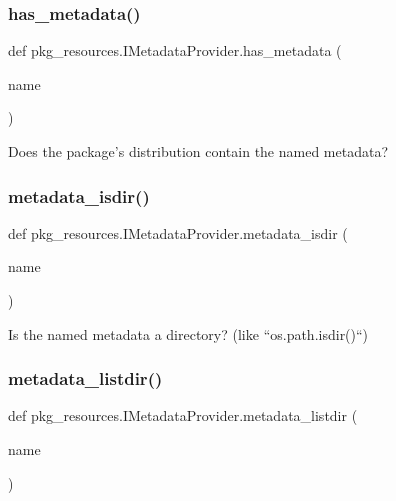 \subsubsection{\texorpdfstring{has\+\_\+metadata()}{has\_metadata()}}
{\footnotesize\ttfamily def pkg\+\_\+resources.\+I\+Metadata\+Provider.\+has\+\_\+metadata (\begin{DoxyParamCaption}\item[{}]{name }\end{DoxyParamCaption})}

\begin{DoxyVerb}Does the package's distribution contain the named metadata?\end{DoxyVerb}
 \mbox{\label{classpkg__resources_1_1_i_metadata_provider_a00c65f8e870e2a8917366c2ccb4d3ef6}} 
\subsubsection{\texorpdfstring{metadata\+\_\+isdir()}{metadata\_isdir()}}
{\footnotesize\ttfamily def pkg\+\_\+resources.\+I\+Metadata\+Provider.\+metadata\+\_\+isdir (\begin{DoxyParamCaption}\item[{}]{name }\end{DoxyParamCaption})}

\begin{DoxyVerb}Is the named metadata a directory?  (like ``os.path.isdir()``)\end{DoxyVerb}
 \mbox{\label{classpkg__resources_1_1_i_metadata_provider_aa64f54075780aff08c98542a4883b3be}} 
\subsubsection{\texorpdfstring{metadata\+\_\+listdir()}{metadata\_listdir()}}
{\footnotesize\ttfamily def pkg\+\_\+resources.\+I\+Metadata\+Provider.\+metadata\+\_\+listdir (\begin{DoxyParamCaption}\item[{}]{name }\end{DoxyParamCaption})}

